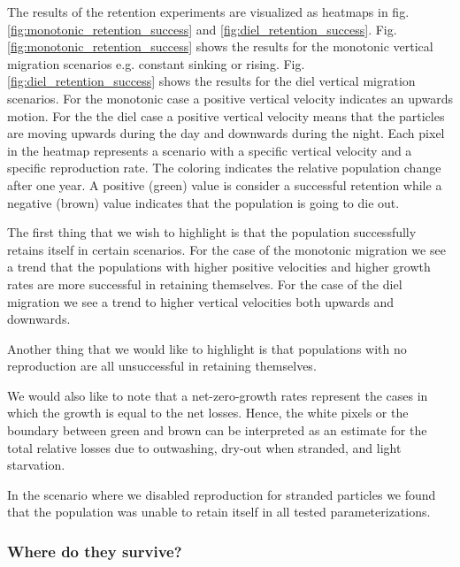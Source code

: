 The results of the retention experiments are visualized as heatmaps in fig. \ref{fig:monotonic_retention_success} and \ref{fig:diel_retention_success}.
Fig. \ref{fig:monotonic_retention_success} shows the results for the monotonic vertical migration scenarios e.g. constant sinking or rising.
Fig. \ref{fig:diel_retention_success} shows the results for the diel vertical migration scenarios. For the monotonic case a positive vertical velocity indicates an upwards motion. For the the diel case a positive vertical velocity means that the particles are moving upwards during the day and downwards during the night.
Each pixel in the heatmap represents a scenario with a specific vertical velocity and a specific reproduction rate. The coloring indicates the relative population change after one year. A positive (green) value is consider a successful retention while a negative (brown) value indicates that the population is going to die out.

The first thing that we wish to highlight is that the population successfully retains itself in certain scenarios. For the case of the monotonic migration we see a trend that the populations with higher positive velocities and higher growth rates are more successful in retaining themselves.
For the case of the diel migration we see a trend to higher vertical velocities both upwards and downwards.

Another thing that we would like to highlight is that populations with no reproduction are all unsuccessful in retaining themselves.

We would also like to note that a net-zero-growth rates represent the cases in which the growth is equal to the net losses.
Hence, the white pixels or the boundary between green and brown can be interpreted as an estimate for the total relative losses due to outwashing, dry-out when stranded, and light starvation.

\medskip

In the scenario where we disabled reproduction for stranded particles we found that the population was unable to retain itself in all tested parameterizations.





\subsubsection*{Where do they survive?}

